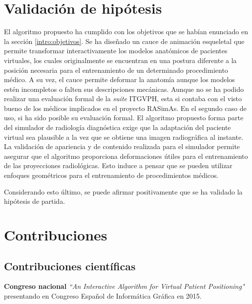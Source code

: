\section{Validación de hipótesis}
\label{conclu:hipotesis}

El algoritmo propuesto ha cumplido con los objetivos que se habían enunciado en la sección \ref{intro:objetivos}. Se ha diseñado un cauce de animación esqueletal que permite transformar interactivamente los modelos anatómicos de pacientes virtuales, los cuales originalmente se encuentran en una postura diferente a la posición necesaria para el entrenamiento de un determinado procedimiento médico. A su vez, el cauce permite deformar la anatomía aunque los modelos estén incompletos o falten sus descripciones mecánicas. Aunque no se ha podido realizar una evaluación formal de la \emph{suite} \ac{ITGVPH}, esta si contaba con el visto bueno de los médicos implicados en el proyecto \ac{RASimAs}.
En el segundo caso de uso, si ha sido posible su evaluación formal.
El algoritmo propuesto forma parte del simulador de radiología diagnóstica exige que la adaptación del paciente virtual sea plausible a la vez que se obtiene una imagen radiográfica al instante.
La validación de apariencia y de contenido realizada para el simulador %
permite asegurar que el algoritmo proporciona deformaciones útiles para el entrenamiento de las proyecciones radiológicas.
Esto induce a pensar que se pueden utilizar enfoques geométricos para el entrenamiento de procedimientos médicos.

Considerando esto último, se puede afirmar positivamente que se ha validado la hipótesis de partida.




\section{Contribuciones}
\subsection{Contribuciones científicas}
\label{conclu:cientifica}

\textbf{Congreso nacional } \emph{``An Interactive Algorithm for Virtual Patient Positioning"} \cite{ceig.20151197} presentando en Congreso Español de Informática Gráfica en 2015. 

